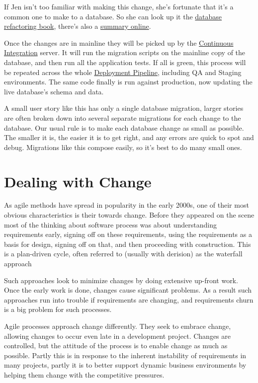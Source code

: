 \documentclass[12pt]{article}
\begin{document}
If Jen isn't too familiar with making this change, she's fortunate that
it's a common one to make to a database. So she can look up it the
\href{https://martinfowler.com/books/refactoringDatabases.html}{database
refactoring book}, there's also a
\href{http://databaserefactoring.com/SplitColumns.html}{summary online}.

Once the changes are in mainline they will be picked up by the
\href{https://martinfowler.com/articles/continuousIntegration.html}{Continuous
Integration} server. It will run the migration scripts on the mainline
copy of the database, and then run all the application tests. If all is
green, this process will be repeated across the whole
\href{https://martinfowler.com/bliki/DeploymentPipeline.html}{Deployment
Pipeline}, including QA and Staging environments. The same code finally
is run against production, now updating the live database's schema and
data.

A small user story like this has only a single database migration,
larger stories are often broken down into several separate migrations
for each change to the database. Our usual rule is to make each database
change as small as possible. The smaller it is, the easier it is to get
right, and any errors are quick to spot and debug. Migrations like this
compose easily, so it's best to do many small ones.


\section{Dealing with Change}

As agile methods have spread in popularity in the early 2000s, one of
their most obvious characteristics is their towards change. Before they
appeared on the scene most of the thinking about software process was
about understanding requirements early, signing off on these
requirements, using the requirements as a basis for design, signing off
on that, and then proceeding with construction. This is a plan-driven
cycle, often referred to (usually with derision) as the waterfall
approach

Such approaches look to minimize changes by doing extensive up-front
work. Once the early work is done, changes cause significant problems.
As a result such approaches run into trouble if requirements are
changing, and requirements churn is a big problem for such processes.

Agile processes approach change differently. They seek to embrace
change, allowing changes to occur even late in a development project.
Changes are controlled, but the attitude of the process is to enable
change as much as possible. Partly this is in response to the inherent
instability of requirements in many projects, partly it is to better
support dynamic business environments by helping them change with the
competitive pressures.
\end{document}
